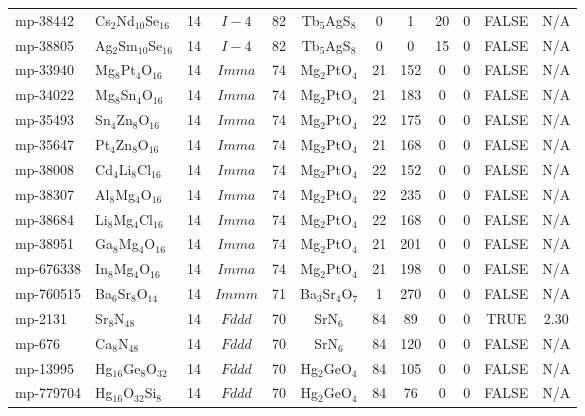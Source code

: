 {\begin{longtable}{llcccccccccc}
    mp-38442 & Cs$_{2}$Nd$_{10}$Se$_{16}$ & 14    & $I-4$ & 82    & Tb$_{5}$AgS$_{8}$ & 0     & 1     & 20    & 0     & FALSE & N/A \\
    mp-38805 & Ag$_{2}$Sm$_{10}$Se$_{16}$ & 14    & $I-4$ & 82    & Tb$_{5}$AgS$_{8}$ & 0     & 0     & 15    & 0     & FALSE & N/A \\
    mp-33940 & Mg$_{8}$Pt$_{4}$O$_{16}$ & 14    & $Imma$ & 74    & Mg$_{2}$PtO$_{4}$ & 21    & 152   & 0     & 0     & FALSE & N/A \\
    mp-34022 & Mg$_{8}$Sn$_{4}$O$_{16}$ & 14    & $Imma$ & 74    & Mg$_{2}$PtO$_{4}$ & 21    & 183   & 0     & 0     & FALSE & N/A \\
    mp-35493 & Sn$_{4}$Zn$_{8}$O$_{16}$ & 14    & $Imma$ & 74    & Mg$_{2}$PtO$_{4}$ & 22    & 175   & 0     & 0     & FALSE & N/A \\
    mp-35647 & Pt$_{4}$Zn$_{8}$O$_{16}$ & 14    & $Imma$ & 74    & Mg$_{2}$PtO$_{4}$ & 21    & 168   & 0     & 0     & FALSE & N/A \\
    mp-38008 & Cd$_{4}$Li$_{8}$Cl$_{16}$ & 14    & $Imma$ & 74    & Mg$_{2}$PtO$_{4}$ & 22    & 152   & 0     & 0     & FALSE & N/A \\
    mp-38307 & Al$_{8}$Mg$_{4}$O$_{16}$ & 14    & $Imma$ & 74    & Mg$_{2}$PtO$_{4}$ & 22    & 235   & 0     & 0     & FALSE & N/A \\
    mp-38684 & Li$_{8}$Mg$_{4}$Cl$_{16}$ & 14    & $Imma$ & 74    & Mg$_{2}$PtO$_{4}$ & 22    & 168   & 0     & 0     & FALSE & N/A \\
    mp-38951 & Ga$_{8}$Mg$_{4}$O$_{16}$ & 14    & $Imma$ & 74    & Mg$_{2}$PtO$_{4}$ & 21    & 201   & 0     & 0     & FALSE & N/A \\
    mp-676338 & In$_{8}$Mg$_{4}$O$_{16}$ & 14    & $Imma$ & 74    & Mg$_{2}$PtO$_{4}$ & 21    & 198   & 0     & 0     & FALSE & N/A \\
    mp-760515 & Ba$_{6}$Sr$_{8}$O$_{14}$ & 14    & $Immm$ & 71    & Ba$_{3}$Sr$_{4}$O$_{7}$ & 1     & 270   & 0     & 0     & FALSE & N/A \\
    mp-2131 & Sr$_{8}$N$_{48}$ & 14    & $Fddd$ & 70    & SrN$_{6}$ & 84    & 89    & 0     & 0     & TRUE  & 2.30  \\
    mp-676 & Ca$_{8}$N$_{48}$ & 14    & $Fddd$ & 70    & SrN$_{6}$ & 84    & 120   & 0     & 0     & FALSE & N/A \\
    mp-13995 & Hg$_{16}$Ge$_{8}$O$_{32}$ & 14    & $Fddd$ & 70    & Hg$_{2}$GeO$_{4}$ & 84    & 105   & 0     & 0     & FALSE & N/A \\
    mp-779704 & Hg$_{16}$O$_{32}$Si$_{8}$ & 14    & $Fddd$ & 70    & Hg$_{2}$GeO$_{4}$ & 84    & 76    & 0     & 0     & FALSE & N/A \\

\end{longtable}}
